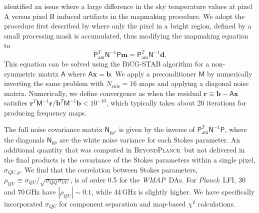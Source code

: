 \documentclass[twocolumn]{../../common/aa}
\def\WMAP{\emph{WMAP}}
\def\Planck{\emph{Planck}}
\newcommand{\bp}{\textsc{BeyondPlanck}}
\begin{document}
\citet{jarosik2010} identified an issue where a large difference in the sky temperature values at pixel A versus pixel B induced artifacts in the mapmaking procedure. We adopt the procedure first described by \citet{hinshaw2003a} where only the pixel in a bright region, defined by a small processing mask \citep{bennett2012} is accumulated, thus modifying the mapmaking equation to
\begin{equation}
	\mathsf P^T_\mathrm{am}\mathsf N^{-1}\mathsf P\boldsymbol m
	=\mathsf P^T_\mathrm{am}\mathsf N^{-1}\boldsymbol d.
\end{equation}
This equation can be solved using the BiCG-STAB algorithm for a non-symmetric matrix $\mathsf A$ where $\mathsf A\boldsymbol x=\boldsymbol b$. We apply a preconditioner $\mathsf M$ by numerically inverting the same problem with $N_\mathrm{side}=16$ maps and applying a diagonal noise matrix. Numerically, we define convergence as when the residual $\boldsymbol r\equiv\boldsymbol b-\mathsf A\boldsymbol x$ satisfies $\boldsymbol r^T\mathsf M^{-1}\boldsymbol r/\boldsymbol b^T\mathsf M^{-1}\boldsymbol b<10^{-10}$, which typically takes about 20 iterations for producing frequency maps.

The full noise covariance matrix $\mathsf N_{pp'}$ is given by the inverse of $\mathsf P^T_\mathrm{am}\mathsf N^{-1}\mathsf P$, where the diagonals $\mathsf N_{pp}$ are the white noise variance for each Stokes parameter. An additional quantity that was computed in \bp\ but not delivered in the final products is the covariance of the Stokes parameters within a single pixel, $\sigma_{QU,p}$. We find that the correlation between Stokes parameters, $\rho_{QU}\equiv\sigma_{QU}/\sqrt{\sigma_{QQ}\sigma_{UU}}$, is of order 0.5 for the \WMAP\ DAs. For \Planck\ LFI, 30 and 70\,GHz have $|\rho_{QU}|\sim0.1$, while 44\,GHz is slightly higher. We have specifically incorporated $\sigma_{QU}$ for component separation and map-based $\chi^2$ calculations.
\end{document}
